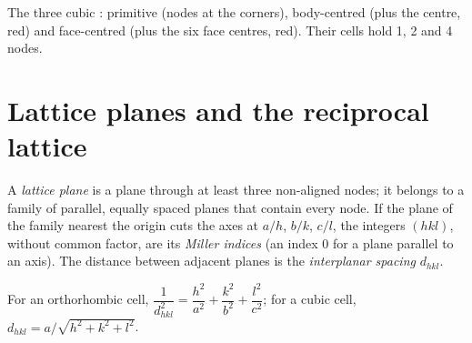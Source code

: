 \begin{omfigure}

{\small The three cubic : primitive (nodes at the corners),
body-centred (plus the centre, red) and face-centred (plus the six face
centres, red). Their cells hold 1, 2 and 4 nodes.}
\end{omfigure}

\section{Lattice planes and the reciprocal lattice}

\begin{definition}\label{def:b3:x-ray-diffraction:miller}
A \emph{lattice plane} is a plane through at least three
non-aligned nodes; it belongs to a family of parallel, equally spaced planes
that contain every node. If the plane of the family nearest the origin cuts
the axes at $a/h$, $b/k$, $c/l$, the integers $(hkl)$, without common factor,
are its \emph{Miller indices} (an index 0 for a plane
parallel to an axis). The distance between adjacent planes is the
\emph{interplanar spacing} $d_{hkl}$.
\end{definition}

\begin{proposition}\label{prop:b3:x-ray-diffraction:spacing}
For an orthorhombic cell, $\dfrac{1}{d_{hkl}^2} = \dfrac{h^2}{a^2} + \dfrac{k^2}{b^2} +
\dfrac{l^2}{c^2}$; for a cubic cell, $d_{hkl} = a/\sqrt{h^2 + k^2 + l^2}$.
\end{proposition}

